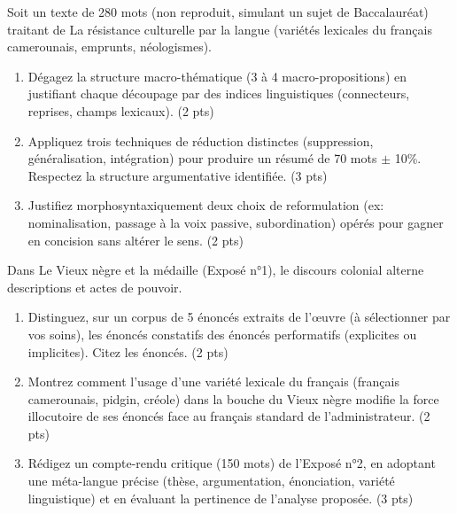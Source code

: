 \documentclass[11pt]{article}
\begin{document}
\begin{exercice}
Soit un texte de 280 mots (non reproduit, simulant un sujet de Baccalauréat) traitant de \og La résistance culturelle par la langue \fg{} (variétés lexicales du français camerounais, emprunts, néologismes).

\begin{enumerate}
    \item Dégagez la structure macro-thématique (3 à 4 macro-propositions) en justifiant chaque découpage par des indices linguistiques (connecteurs, reprises, champs lexicaux). (2 pts)
    \item Appliquez trois techniques de réduction distinctes (suppression, généralisation, intégration) pour produire un résumé de 70 mots $\pm$ 10\%. Respectez la structure argumentative identifiée. (3 pts)
    \item Justifiez morphosyntaxiquement deux choix de reformulation (ex: nominalisation, passage à la voix passive, subordination) opérés pour gagner en concision sans altérer le sens. (2 pts)
\end{enumerate}
\end{exercice}

\begin{exercice}
Dans \og Le Vieux nègre et la médaille \fg{} (Exposé n°1), le discours colonial alterne descriptions et actes de pouvoir.

\begin{enumerate}
    \item Distinguez, sur un corpus de 5 énoncés extraits de l'œuvre (à sélectionner par vos soins), les énoncés constatifs des énoncés performatifs (explicites ou implicites). Citez les énoncés. (2 pts)
    \item Montrez comment l'usage d'une variété lexicale du français (français camerounais, pidgin, créole) dans la bouche du \og Vieux nègre \fg{} modifie la force illocutoire de ses énoncés face au français standard de l'administrateur. (2 pts)
    \item Rédigez un compte-rendu critique (150 mots) de l'Exposé n°2, en adoptant une méta-langue précise (thèse, argumentation, énonciation, variété linguistique) et en évaluant la pertinence de l'analyse proposée. (3 pts)
\end{enumerate}
\end{exercice}
\end{document}
